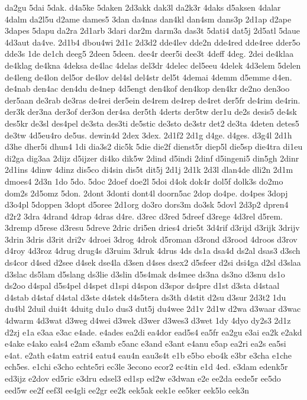 {da2gu
5dai
5dak.
d4a5ke
5daken
2d3akk
dak3l
da2k3r
4daks
d5aksen
4dalar
4dalm
da2l5u
d2ame
dames5
3dan
da4nas
dan4kl
dan4sm
dans3p
2d1ap
d2ape
3dapes
5dapu
da2ra
2d1arb
3dari
dar2m
darm3a
das3t
5dati4
dat5j
2d5atl
5daue
4d3aut
da4ve.
2d1b4
dbou4wi
2d1c
2d3d2
dde4lev
dde2n
dde4red
dde4ree
dder5o
dde3s
1de
de1ch
deeg5
2deen
5deen.
dee4r
deer5i
dee3t
4deff
4deg.
2dei
de4klaa
de4klag
de4kna
4deksa
de4lac
4delas
del3dr
4delec
del5eeu
4delek
4d3elem
5delen
de4leng
de4lon
del5or
de4lov
del4sl
del4str
del5t
4demai
4demm
d5emme
d4en.
de4nab
den4ac
den4du
de4nep
4d5engt
den4kof
den4kop
den4kr
de2no
den3oo
der5aan
de3rab
de3ras
de4rei
der5ein
de4rem
de4rep
de4ret
der5fr
de4rim
de4rin.
der3k
der3na
der3of
der3on
der4sa
der5th
4derts
der5tw
der1u
de2s
desis5
de4sk
des5kr
de3sl
des4pel
de3sta
des3ti
de5stic
de3sto
de3str
det2
de3ta
4deten
detes5
de3tw
4d5eu4ro
de5us.
dewin4d
2dex
3dex.
2d1f2
2d1g
d4ge.
d4ges.
d3g4l
2d1h
d3he
dher5i
dhun4
1di
dia3s2
dic5k
5die
die2f
dienst5r
diep5l
die5sp
die4tra
di1eu
di2ga
dig3aa
2dijz
d5ijzer
di4ko
dik5w
2dind
d5indi
2dinf
d5ingeni5
din5gh
2dinr
2d1ins
4dinw
4dinz
dis5co
di4sin
dis5t
dit5j
2d1j
2d1k
2d3l
dlan4de
dli2n
2d1m
dmoes4
2d3n
1do
5do.
5doc
2doef
doe2l
5doi
d4ok
dok4r
dol5f
dolk3s
do2mo
dom2s
2d5omz
5don.
2dont
3donti
dont4l
doorn5ac
2dop
do4pe.
do4pes
3dopj
d3o4pl
5doppen
3dopt
d5oree
2d1org
do3ro
dors3m
do3sk
5dovl
2d3p2
dpren4
d2r2
3dra
4drand
4drap
4dras
d4re.
d3rec
d3red
5dreef
d3rege
4d3rel
d5rem.
3dremp
d5rese
d3resu
5dreve
2dric
dri5en
dries4
drie5t
3d4rif
d3rijd
d3rijk
3drijv
3drin
3dris
d3rit
dri2v
4droei
3drog
4drok
d5roman
d3rond
d3rood
4droos
d3rov
d4roy
4d3roz
4drug
drug4s
d3ruim
3druk
4drus
4ds
ds1a
dsa4d
ds2al
dsas3
d3sch
ds4cor
d4sed
d2see
d4sek
dse4la
d3sen
d4ses
dsex2
d5sfeer
d2si
dsi4ga
d2sl
d3slaa
d3slac
ds5lam
d5slang
ds3lie
d3slin
d5s4mak
ds4mee
ds3na
ds3no
d3snu
ds1o
ds2oo
d4spal
d5s4pel
d4spet
d1spi
d4spon
d3spor
ds4pre
d1st
d3sta
d4staal
d4stab
d4staf
d4stal
d3ste
d4stek
d4s5tera
ds3th
d4stit
d2su
d3sur
2d3t2
1du
du4bl
2duil
dui4t
4duitg
du1o
dus3
dut5j
du4wee
2d1v
2d1w
d2wa
d3waar
d3wac
4dwarm
4d3wat
d3weg
d4wei
d3wek
d3wer
d3wes3
d3wet
1dy
4dyo
dy2s3
2d1z
d2zj
e1a
e3aa
e3ac
e4ade.
e4ades
ea2di
ea4dor
ead5s4
ea5fr
ea2gu
e3ai
ea2k
e2akd
e4ake
e4ako
eals4
e2am
e3amb
e5anc
e3and
e3ant
e4anu
e5ap
ea2ri
ea2s
ea5si
e4at.
e2ath
e4atm
eatri4
eatu4
eau4n
eau3s4t
e1b
e5bo
ebo4k
e3br
e3cha
e1che
ech5es.
e1chi
e3cho
echte5ri
ec3le
3econo
ecor2
ec4tin
e1d
4ed.
e3dam
edenk5r
ed3ijz
e2dov
ed5ric
e3dru
edsel3
ed1sp
ed2w
e3dwan
e2e
ee2da
eede5r
ee5do
eed5w
ee2f
eef3l
ee4gli
ee2gr
ee2k
eek5ak
eek1e
ee5ker
eek5lo
eek3n
}
